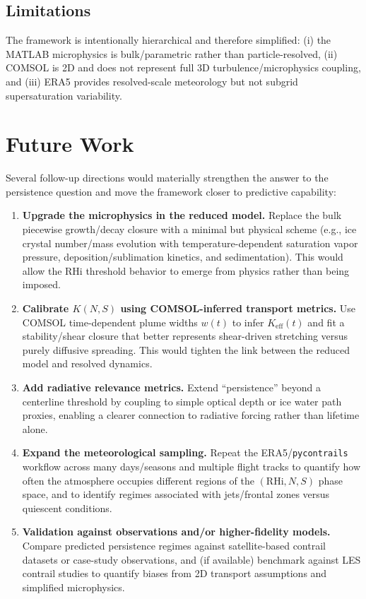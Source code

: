\documentclass[11pt]{article}
\begin{document}
\subsection{Limitations}
The framework is intentionally hierarchical and therefore simplified:
(i) the MATLAB microphysics is bulk/parametric rather than particle-resolved,
(ii) COMSOL is 2D and does not represent full 3D turbulence/microphysics coupling, and
(iii) ERA5 provides resolved-scale meteorology but not subgrid supersaturation variability.


\section{Future Work}
\label{sec:future}

Several follow-up directions would materially strengthen the answer to the persistence question and
move the framework closer to predictive capability:

\begin{enumerate}
    \item \textbf{Upgrade the microphysics in the reduced model.}
    Replace the bulk piecewise growth/decay closure with a minimal but physical scheme
    (e.g., ice crystal number/mass evolution with temperature-dependent saturation vapor pressure,
    deposition/sublimation kinetics, and sedimentation). This would allow the RHi threshold behavior
    to emerge from physics rather than being imposed.
    \item \textbf{Calibrate $K(N,S)$ using COMSOL-inferred transport metrics.}
    Use COMSOL time-dependent plume widths $w(t)$ to infer $K_{\mathrm{eff}}(t)$ and fit a stability/shear
    closure that better represents shear-driven stretching versus purely diffusive spreading.
    This would tighten the link between the reduced model and resolved dynamics.
    \item \textbf{Add radiative relevance metrics.}
    Extend “persistence” beyond a centerline threshold by coupling to simple optical depth or ice water
    path proxies, enabling a clearer connection to radiative forcing rather than lifetime alone.
    \item \textbf{Expand the meteorological sampling.}
    Repeat the ERA5/\texttt{pycontrails} workflow across many days/seasons and multiple flight tracks
    to quantify how often the atmosphere occupies different regions of the $(\mathrm{RHi},N,S)$ phase space,
    and to identify regimes associated with jets/frontal zones versus quiescent conditions.
    \item \textbf{Validation against observations and/or higher-fidelity models.}
    Compare predicted persistence regimes against satellite-based contrail datasets or case-study
    observations, and (if available) benchmark against LES contrail studies to quantify biases from 2D
    transport assumptions and simplified microphysics.
\end{enumerate}
\end{document}
